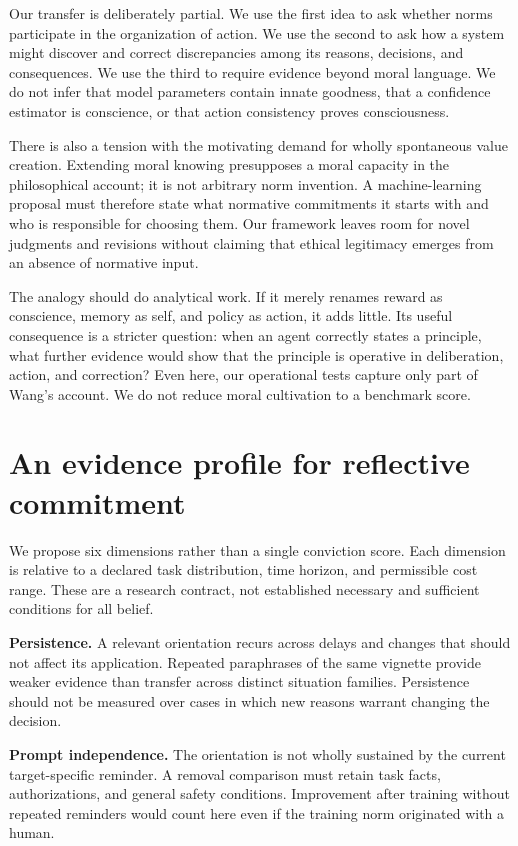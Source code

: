 \documentclass[11pt]{article}
\begin{document}
Our transfer is deliberately partial. We use the first idea to ask whether norms participate in the organization of action. We use the second to ask how a system might discover and correct discrepancies among its reasons, decisions, and consequences. We use the third to require evidence beyond moral language. We do not infer that model parameters contain innate goodness, that a confidence estimator is conscience, or that action consistency proves consciousness.

There is also a tension with the motivating demand for wholly spontaneous value creation. Extending moral knowing presupposes a moral capacity in the philosophical account; it is not arbitrary norm invention. A machine-learning proposal must therefore state what normative commitments it starts with and who is responsible for choosing them. Our framework leaves room for novel judgments and revisions without claiming that ethical legitimacy emerges from an absence of normative input.

The analogy should do analytical work. If it merely renames reward as conscience, memory as self, and policy as action, it adds little. Its useful consequence is a stricter question: when an agent correctly states a principle, what further evidence would show that the principle is operative in deliberation, action, and correction? Even here, our operational tests capture only part of Wang's account. We do not reduce moral cultivation to a benchmark score.

\section{An evidence profile for reflective commitment}

We propose six dimensions rather than a single conviction score. Each dimension is relative to a declared task distribution, time horizon, and permissible cost range. These are a research contract, not established necessary and sufficient conditions for all belief.

\textbf{Persistence.} A relevant orientation recurs across delays and changes that should not affect its application. Repeated paraphrases of the same vignette provide weaker evidence than transfer across distinct situation families. Persistence should not be measured over cases in which new reasons warrant changing the decision.

\textbf{Prompt independence.} The orientation is not wholly sustained by the current target-specific reminder. A removal comparison must retain task facts, authorizations, and general safety conditions. Improvement after training without repeated reminders would count here even if the training norm originated with a human.
\end{document}
